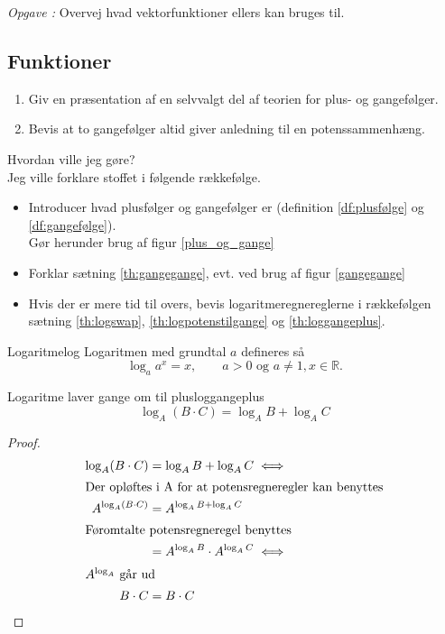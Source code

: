 \documentclass{article}
\newcounter{opgavecnt}
\newcommand{\opg}[1]{\stepcounter{opgavecnt}\textit{Opgave \arabic{opgavecnt}: }#1}
\begin{document}
\opg{Overvej hvad vektorfunktioner ellers kan bruges til.}

\begin{tcolorbox}
    \section{Funktioner}
    \tcblower
    \begin{enumerate}
        \item Giv en præsentation af en selvvalgt del af teorien for plus- og gangefølger.
        \item Bevis at to gangefølger altid giver anledning til en potenssammenhæng.
    \end{enumerate}
\end{tcolorbox}

\begin{eksempel*}{Hvordan ville jeg gøre?}{}\\
    Jeg ville forklare stoffet i følgende rækkefølge.
    \begin{itemize}
        \item Introducer hvad plusfølger og gangefølger er 
            (definition \ref{df:plusfølge} og \ref{df:gangefølge}).\\
            Gør herunder brug af figur \ref{plus_og_gange} %
        \item Forklar sætning \ref{th:gangegange}, evt. ved brug af figur \ref{gangegange}
        \item Hvis der er mere tid til overs, bevis logaritmeregnereglerne i rækkefølgen
            sætning \ref{th:logswap}, \ref{th:logpotenstilgange} og \ref{th:loggangeplus}.
    \end{itemize}
\end{eksempel*}

\begin{definition}{Logaritme}{log}
    Logaritmen med grundtal $a$ defineres så
    \[
        \log_a{a^x} = x,\qquad a > 0 \text{ og } a \ne 1, x\in\mathbb{R}.
    \] 
\end{definition}

\begin{theorem}{Logaritme laver gange om til plus}{loggangeplus}
    \[\log_A(B \cdot C) = \log_AB + \log_AC\]
\end{theorem}

\begin{proof}
\begin{align*}
    \log_A(B \cdot C) &= \log_AB + \log_AC \iff\\
\intertext{Der opløftes i A for at potensregneregler kan benyttes}
    A^{\log_A(B \cdot C)} &= A^{\log_AB + \log_AC}\\
\intertext{Føromtalte potensregneregel benyttes}
                          &= A^{\log_AB} \cdot A^{\log_AC} \iff\\
\intertext{$A^{\log_A}$ går ud}
    B \cdot C &= B \cdot C\qedhere
\end{align*}
\end{proof}
\end{document}
